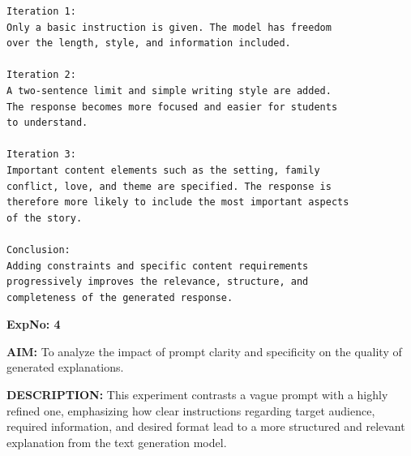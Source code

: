 \documentclass[10pt,a4paper]{article}
\begin{document}
\begin{lstlisting}[style=output]
Iteration 1:
Only a basic instruction is given. The model has freedom
over the length, style, and information included.

Iteration 2:
A two-sentence limit and simple writing style are added.
The response becomes more focused and easier for students
to understand.

Iteration 3:
Important content elements such as the setting, family
conflict, love, and theme are specified. The response is
therefore more likely to include the most important aspects
of the story.

Conclusion:
Adding constraints and specific content requirements
progressively improves the relevance, structure, and
completeness of the generated response.
\end{lstlisting}


\clearpage

\noindent\textbf{ExpNo: 4}

\noindent\textbf{AIM:} To analyze the impact of prompt clarity and specificity on the quality of generated explanations.

\noindent\textbf{DESCRIPTION:} This experiment contrasts a vague prompt with a highly refined one, emphasizing how clear instructions regarding target audience, required information, and desired format lead to a more structured and relevant explanation from the text generation model.
\end{document}
